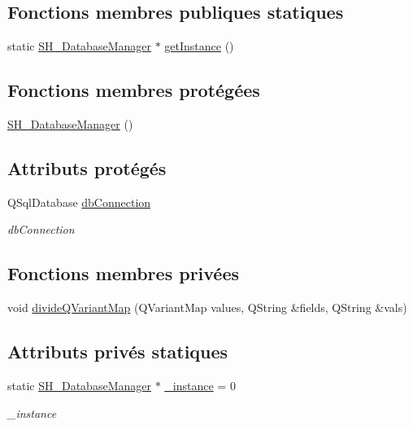 \subsection*{Fonctions membres publiques statiques}
\begin{DoxyCompactItemize}
\item 
static \hyperlink{classSH__DatabaseManager}{S\-H\-\_\-\-Database\-Manager} $\ast$ \hyperlink{classSH__DatabaseManager_a31198eb4de0f8b18e3fa0eed09f24d19}{get\-Instance} ()
\end{DoxyCompactItemize}
\subsection*{Fonctions membres protégées}
\begin{DoxyCompactItemize}
\item 
\hyperlink{classSH__DatabaseManager_a7b5d0e372c153eb59cdab98588994904}{S\-H\-\_\-\-Database\-Manager} ()
\end{DoxyCompactItemize}
\subsection*{Attributs protégés}
\begin{DoxyCompactItemize}
\item 
Q\-Sql\-Database \hyperlink{classSH__DatabaseManager_a9291f61c3abbba2c4f1567b1d8325f0e}{db\-Connection}
\begin{DoxyCompactList}\small\item\em db\-Connection \end{DoxyCompactList}\end{DoxyCompactItemize}
\subsection*{Fonctions membres privées}
\begin{DoxyCompactItemize}
\item 
void \hyperlink{classSH__DatabaseManager_a4562e0c0027c0adbba645edc433f7fd1}{divide\-Q\-Variant\-Map} (Q\-Variant\-Map values, Q\-String \&fields, Q\-String \&vals)
\end{DoxyCompactItemize}
\subsection*{Attributs privés statiques}
\begin{DoxyCompactItemize}
\item 
static \hyperlink{classSH__DatabaseManager}{S\-H\-\_\-\-Database\-Manager} $\ast$ \hyperlink{classSH__DatabaseManager_a8ca37d0cafa6a181582d60e045a8d5ab}{\-\_\-instance} = 0
\begin{DoxyCompactList}\small\item\em \-\_\-instance \end{DoxyCompactList}\end{DoxyCompactItemize}


